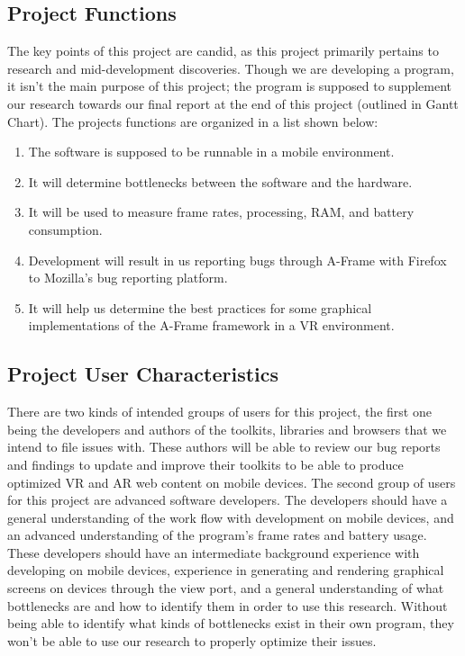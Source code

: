 \documentclass[letterpaper,10pt,draftclsnofoot,onecolumn,compsoc]{IEEEtran}
\begin{document}
\subsection{Project Functions}
\begin{singlespace}
\noindent
The key points of this project are candid, as this project primarily pertains to research and mid-development discoveries. Though we are developing a program, it isn't the main purpose of this project; the program is supposed to supplement our research towards our final report at the end of this project (outlined in Gantt Chart). The projects functions are organized in a list shown below:\\
\begin{enumerate}[labelsep=2em,leftmargin=.5in]
    \item The software is supposed to be runnable in a mobile environment.
    \item It will determine bottlenecks between the software and the hardware.
    \item It will be used to measure frame rates, processing, RAM, and battery consumption.
    \item Development will result in us reporting bugs through A-Frame with Firefox to Mozilla's bug reporting platform.
    \item It will help us determine the best practices for some graphical implementations of the A-Frame framework in a VR environment.
\end{enumerate}
\end{singlespace}

\subsection{Project User Characteristics}
\begin{singlespace}
\noindent
There are two kinds of intended groups of users for this project, the first one being the developers and authors of the toolkits, libraries and browsers that we intend to file issues with. These authors will be able to review our bug reports and findings to update and improve their toolkits to be able to produce optimized VR and AR web content on mobile devices. The second group of users for this project are advanced software developers. The developers should have a general understanding of the work flow with development on mobile devices, and an advanced understanding of the program's frame rates and battery usage. These developers should have an intermediate background experience with developing on mobile devices, experience in generating and rendering graphical screens on devices through the view port, and a general understanding of what bottlenecks are and how to identify them in order to use this research. Without being able to identify what kinds of bottlenecks exist in their own program, they won't be able to use our research to properly optimize their issues.
\end{singlespace}
\end{document}
